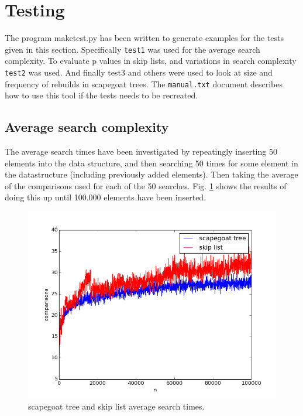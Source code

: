 \documentclass[12pt, a4paper]{article}
\begin{document}




\section*{Testing}
The program maketest.py has been written to generate examples for the tests given in this section. 
Specifically \texttt{test1} was used for the average search complexity.
To evaluate p values in skip lists, and variations in search complexity \texttt{test2} was used. 
And finally test3 and others were used to look at size and frequency of rebuilds in scapegoat trees.
The \texttt{manual.txt} document describes how to use this tool if the tests needs to be recreated.

\subsection*{Average search complexity}
The average search times have been investigated by repeatingly inserting 50 elements into the data structure, and then searching 50 times for some 
element in the datastructure (including previously added elements). Then taking the average of the comparisons used for each of the 50 searches.
Fig. \ref{avgsearch} shows the results of doing this up until 100.000 elements have been inserted.

\begin{figure}[H]
    \centering
    \includegraphics[width=1\textwidth]{averagesearch.png}
    \caption{scapegoat tree and skip list average search times.}
    \label{avgsearch}
\end{figure}
\end{document}
